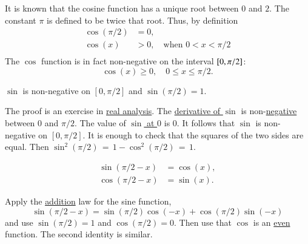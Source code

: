 It is known that the cosine function has a unique root between $0$
and $2$. The constant $\pi$ is defined to be twice that root.  Thus, by
definition 
\begin{equation}\label{eqn:cospi2}
\begin{array}{rll}
\cos(\pi/2) &= 0,\\
\cos(x) &>0,\quad \text{when } 0<x<\pi/2\\
\end{array}
\end{equation}
The $\cos$ function is in fact
non-negative on the interval $[ 0,\pi/2]$:
\begin{equation}\label{eqn:cospos}
\cos(x)\ge 0,   \quad 0\le x \le \pi/2.
\end{equation}
%

\begin{lemma}[]\label{lemma:sin-pi2}
$\sin$ is non-negative on $[0,\pi/2]$ and  $\sin (\pi/2) = 1.$
\end{lemma}

\begin{proved}
  The proof is an exercise in \hyperref[back:analysis]{real analysis}.
  The \hyperref[eqn:cos']{derivative of $\sin$} is
  non-\hyperref[eqn:cospos]{negative} between $0$ and $\pi/2$.  The
  value of \hyperref[eqn:cos0]{$\sin$ at $0$} is $0$.  It follows that
  $\sin$ is non-negative on $[0,\pi/2]$.  It is enough to check that
  the squares of the two sides are equal.  Then $\sin^2(\pi/2)
  \hyperref[lemma:circle]{\,=\,} {1-\cos^2(\pi/2)}
  \hyperref[eqn:cospi2]{\,=\,} 1$.  \swallowed\end{proved}

\begin{lemma}[]\label{lemma:cos-sin}
\begin{displaymath}
\begin{array}{rll}
\sin(\pi/2 - x)  &= \cos(x),\\
\cos(\pi/2 - x)&=\sin(x).
\end{array}
\end{displaymath}
\end{lemma}

\begin{proved}
Apply the \hyperref[lemma:sin-add]{addition} law for the sine function,
\begin{displaymath}
\sin(\pi/2 - x) = \sin(\pi/2)\cos(-x) + \cos(\pi/2)\sin(-x)
\end{displaymath}
and use \hyperref[lemma:sin-pi2]{$\sin(\pi/2) = 1$} and
\hyperref[eqn:cospi2]{$\cos(\pi/2) = 0$}.  Then use that $\cos$ is an
\hyperref[lemma:cos-neg]{even} function.  The second identity is
similar.  \swallowed\end{proved}

